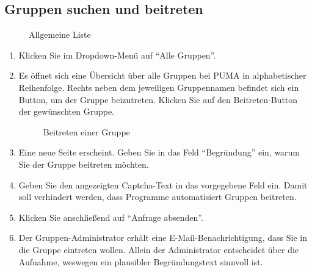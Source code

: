 \subsection{Gruppen suchen und beitreten}
\label{subsec:gruppenSuchenBeitreten}

\begin{figure}[h!]
 \centering
 \caption{Allgemeine Liste}
 \label{fig:allgemeineListe}
\end{figure}
\begin{enumerate}

Im Hauptmenü \enquote{Gruppen} im . Ein Dropdown-Menü öffnet sich.
    \item Klicken Sie im Dropdown-Menü auf \enquote{Alle Gruppen}.
    \item Es öffnet sich eine Übersicht über alle Gruppen bei PUMA in alphabetischer Reihenfolge. Rechts neben dem jeweiligen Gruppennamen befindet sich ein Button, um der Gruppe beizutreten. Klicken Sie auf den Beitreten-Button der gewünschten Gruppe.
\begin{figure}[h!]
 \centering
 \caption{Beitreten einer Gruppe}
 \label{fig:gruppeBeitreten}
\end{figure}
    \item Eine neue Seite erscheint. Geben Sie in das Feld \enquote{Begründung} ein, warum Sie der Gruppe beitreten möchten.
    \item Geben Sie den angezeigten Captcha-Text in das vorgegebene Feld ein. Damit soll verhindert werden, dass Programme automatisiert Gruppen beitreten. 
    \item Klicken Sie anschließend auf \enquote{Anfrage absenden}.
    \item Der Gruppen-Administrator erhält eine E-Mail-Benachrichtigung, dass Sie in die Gruppe eintreten wollen. Allein der Administrator entscheidet über die Aufnahme, weswegen ein plausibler Begründungstext sinnvoll ist.
\end{enumerate}
